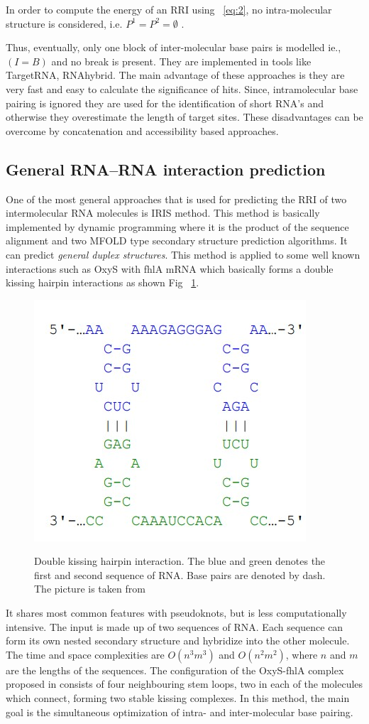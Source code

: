 \documentclass[twoside,a4paper]{report}
\numberwithin{equation}{section}
\begin{document}
	In order to compute the energy of an RRI using ~\ref{eq:2}, no intra-molecular structure is considered, i.e. $P^1=P^2= \emptyset $ .
	
	Thus, eventually, only one block of inter-molecular base pairs is modelled ie., $(I = B)$ and no break is present. They are implemented in tools like TargetRNA, RNAhybrid. The main advantage of these approaches is they are very fast and easy to calculate the significance of hits.  Since,  intramolecular base pairing is ignored they are used for the identification of short RNA's and otherwise they overestimate the length of target sites. These disadvantages can be overcome by concatenation and accessibility based approaches.\\ 
	
	\subsection{General RNA–RNA interaction prediction}
	One of the most general approaches that is used for predicting the RRI of two intermolecular RNA molecules is IRIS \citep{pervouchine2004iris} method. This method is basically implemented by dynamic programming where it is the product of the sequence alignment and two MFOLD type secondary structure prediction algorithms. It can predict \textit{general duplex structures}. This method is applied to some well known interactions such as OxyS with fhlA mRNA which basically forms a double kissing hairpin interactions as shown Fig ~\ref{fig:doublekiss}.\\
	
	 \begin{figure}[tb]
		\includegraphics[width=0.4\linewidth]{doublekiss}
		\centering
		\caption{ Double kissing hairpin interaction. The blue and green denotes the first and second sequence of RNA. Base pairs are denoted by dash. The picture is taken from  } 
		\citep{wright2018structure}
		\label{fig:doublekiss}
	\end{figure}
	
	It shares most common features with pseudoknots, but is less computationally intensive. The input is made up of two sequences of RNA. Each sequence can form its own nested secondary structure and hybridize into the other molecule. The  time and space complexities are $O(n^3m^3)$ and $O(n^2m^2)$, where $n$ and $m$ are the lengths of the sequences. The configuration of the OxyS-fhlA complex proposed in \citep{argaman2000fhla} consists of four neighbouring stem loops, two in each of the molecules which connect, forming two stable kissing complexes. In this method, the main goal is the simultaneous optimization of intra- and inter-molecular base pairing.\\
\end{document}
